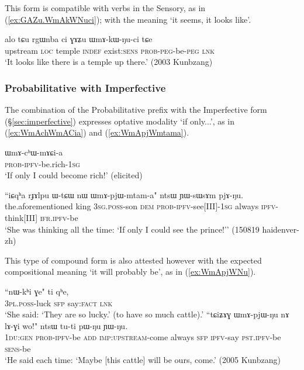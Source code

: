 This form is compatible with verbs in the Sensory, as in (\ref{ex:GAZu.WmAkWNuci}); with the meaning `it seems, it looks like'.

\begin{exe}
\ex \label{ex:GAZu.WmAkWNuci}
\gll alo tɕu rgɯnba ci ɣɤʑu ɯmɤ-kɯ-ŋu-ci tɕe \\
upstream \textsc{loc} temple \textsc{indef} exist:\textsc{sens} \textsc{prob}-\textsc{peg}-be-\textsc{peg} \textsc{lnk} \\
\glt `It looks like there is a temple up there.' (2003 Kunbzang)
\end{exe}

\subsubsection{Probabilitative with Imperfective} \label{sec:WmA.ipfv}
The combination of the Probabilitative prefix with the Imperfective form (§\ref{sec:imperfective}) expresses optative modality `if only...', as in (\ref{ex:WmAchWmACia}) and (\ref{ex:WmApjWmtama}).

\begin{exe}
\ex \label{ex:WmAchWmACia}
\gll ɯmɤ-cʰɯ-mɤɕi-a \\
\textsc{prob}-\textsc{ipfv}-be.rich-\textsc{1sg} \\
\glt `If only I could become rich!' (elicited)
\end{exe}

\begin{exe}
\ex \label{ex:WmApjWmtama}
\gll ``iɕqʰa rɟɤlpu ɯ-tɕɯ nɯ ɯmɤ-pjɯ-mtam-a" ntsɯ ɲɯ-sɯsɤm pjɤ-ŋu. \\
the.aforementioned king \textsc{3sg}.\textsc{poss}-son \textsc{dem} \textsc{prob}-\textsc{ipfv}-see[III]-\textsc{1sg} always \textsc{ipfv}-think[III] \textsc{ifr}.\textsc{ipfv}-be \\
\glt `She was thinking all the time: `If only I could see the prince!'' (150819 haidenver-zh)
\end{exe}

This type of compound form is also attested however with the expected compositional meaning `it will probably be', as in (\ref{ex:WmApjWNu}).

\begin{exe}
\ex 
\begin{xlist}
\ex  
\gll ``nɯ-kʰi ɣe" ti qʰe, \\
\textsc{3pl}.\textsc{poss}-luck \textsc{sfp} say:\textsc{fact} \textsc{lnk} \\
\glt `She said: `They are so lucky.' (to have so much cattle).' 
\ex \label{ex:WmApjWNu}
\gll ``tɕiʑɤɣ ɯmɤ-pjɯ-ŋu nɤ lɤ-ɣi wo!" ntsɯ tu-ti pɯ-ŋu ɲɯ-ŋu. \\
\textsc{1du}:\textsc{gen} \textsc{prob}-\textsc{ipfv}-be \textsc{add} \textsc{imp}:\textsc{upstream}-come always \textsc{sfp} \textsc{ipfv}-say \textsc{pst}.\textsc{ipfv}-be \textsc{sens}-be \\
\glt `He said each time: `Maybe [this cattle] will be ours, come.' (2005 Kunbzang)
\end{xlist}
 \end{exe}
 

